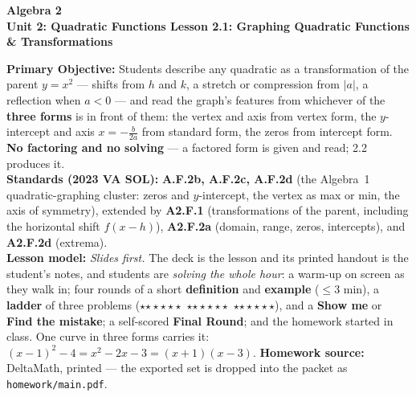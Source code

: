 \documentclass[10pt]{article}
\newcommand{\CourseName}{Algebra 2}
\newcommand{\UnitNumberName}{Unit 2: Quadratic Functions \quad}
\newcommand{\LessonNumberName}{Lesson 2.1: Graphing Quadratic Functions \& Transformations}
\newcommand{\rung}[1]{{\color{goldacc}\ifcase#1\or$\star$\or$\star\star$\or$\star\star\star$\fi}}
\begin{document}
\begin{center}
    {\Large\bfseries \CourseName \\
    {\small\bfseries \UnitNumberName \LessonNumberName}}
\end{center}

\begin{tcolorbox}[colback=forestbg, colframe=forest, boxrule=0.9pt, arc=2mm,
    left=2mm, right=2mm, top=1.5mm, bottom=1.5mm]
    \textbf{Primary Objective:} Students describe any quadratic as a transformation of the
    parent $y=x^2$ --- shifts from $h$ and $k$, a stretch or compression from $|a|$, a reflection
    when $a<0$ --- and read the graph's features from whichever of the \textbf{three forms} is in
    front of them: the vertex and axis from vertex form, the $y$-intercept and axis
    $x=-\frac{b}{2a}$ from standard form, the zeros from intercept form. \textbf{No factoring and
    no solving} --- a factored form is given and read; 2.2 produces it.
    \\[2pt]
    \textbf{Standards (2023 VA SOL):} \textbf{A.F.2b, A.F.2c, A.F.2d} (the Algebra~1
    quadratic-graphing cluster: zeros and $y$-intercept, the vertex as max or min, the axis of
    symmetry), extended by \textbf{A2.F.1} (transformations of the parent, including the
    horizontal shift $f(x-h)$), \textbf{A2.F.2a} (domain, range, zeros, intercepts), and
    \textbf{A2.F.2d} (extrema).
    \\[2pt]
    \textbf{Lesson model:} \emph{Slides first.} The deck is the lesson and its printed handout is
    the student's notes, and students are \emph{solving the whole hour}: a warm-up on screen as
    they walk in; four rounds of a short \textbf{definition} and \textbf{example} ($\le$3 min),
    a \textbf{ladder} of three problems (\rung1\ \rung2\ \rung3), and a \textbf{Show me} or
    \textbf{Find the mistake}; a self-scored \textbf{Final Round}; and the homework started in
    class. One curve in three forms carries it: $(x-1)^2-4=x^2-2x-3=(x+1)(x-3)$.
    \textbf{Homework source:} DeltaMath, printed --- the exported set is dropped into the packet
    as \texttt{homework/main.pdf}.
\end{tcolorbox}
\end{document}
